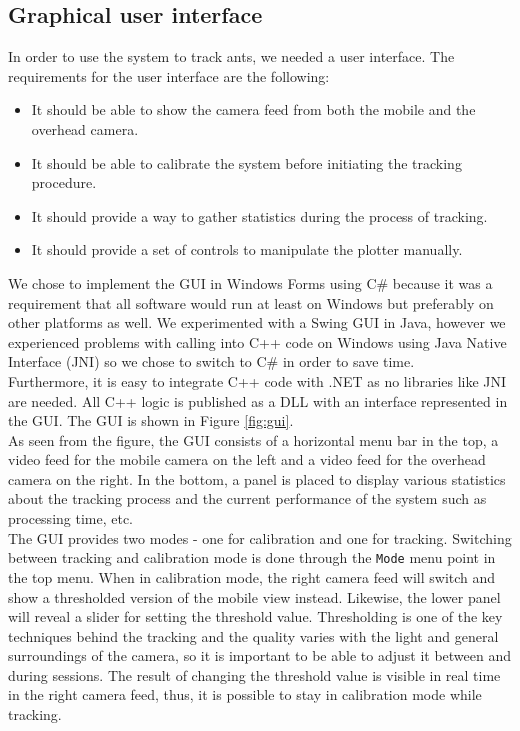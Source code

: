 
\subsection{Graphical user interface}


In order to use the system to track ants, we needed a user interface. The requirements for the user interface are the following:

\begin{itemize}
  \item{It should be able to show the camera feed from both the mobile and the overhead camera}.
  \item{It should be able to calibrate the system before initiating the tracking procedure}.
  \item{It should provide a way to gather statistics during the process of tracking}.
  \item{It should provide a set of controls to manipulate the plotter manually}.
\end{itemize}


We chose to implement the GUI in Windows Forms using C\# because it was a requirement that all software would run at least on Windows but preferably on other platforms as well. We experimented with a Swing GUI in Java, however we experienced problems with calling into C++ code on Windows using Java Native Interface (JNI) so we chose to switch to C\# in order to save time. \\

Furthermore, it is easy to integrate C++ code with .NET as no libraries like JNI are needed. All C++ logic is published as a DLL with an interface represented in the GUI. The GUI is shown in Figure \ref{fig:gui}. \\

As seen from the figure, the GUI consists of a horizontal menu bar in the top, a video feed for the mobile camera on the left and a video feed for the overhead camera on the right. In the bottom, a panel is placed to display various statistics about the tracking process and the current performance of the system such as processing time, etc. \\

The GUI provides two modes - one for calibration and one for tracking. Switching between tracking and calibration mode is done through the \texttt{Mode} menu point in the top menu. When in calibration mode, the right camera feed will switch and show a thresholded version of the mobile view instead. Likewise, the lower panel will reveal a slider for setting the threshold value. Thresholding is one of the key techniques behind the tracking and the quality varies with the light and general surroundings of the camera, so it is important to be able to adjust it between and during sessions. The result of changing the threshold value is visible in real time in the right camera feed, thus, it is possible to stay in calibration mode while tracking. \\

